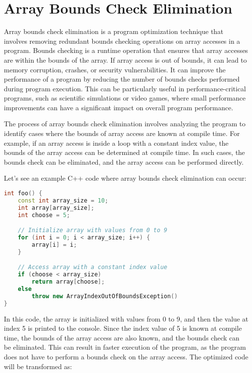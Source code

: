\section{Array Bounds Check Elimination}
\label{sec:array}

Array bounds check elimination is a program optimization technique that involves removing redundant bounds checking operations on array accesses in a program. Bounds checking is a runtime operation that ensures that array accesses are within the bounds of the array. If array access is out of bounds, it can lead to memory corruption, crashes, or security vulnerabilities. It can improve the performance of a program by reducing the number of bounds checks performed during program execution. This can be particularly useful in performance-critical programs, such as scientific simulations or video games, where small performance improvements can have a significant impact on overall program performance.

The process of array bounds check elimination involves analyzing the program to identify cases where the bounds of array access are known at compile time. For example, if an array access is inside a loop with a constant index value, the bounds of the array access can be determined at compile time. In such cases, the bounds check can be eliminated, and the array access can be performed directly.

Let's see an example C++ code where array bounds check elimination can occur:

\begin{lstlisting}[language=C++]
int foo() {
    const int array_size = 10;
    int array[array_size];
    int choose = 5;

    // Initialize array with values from 0 to 9
    for (int i = 0; i < array_size; i++) {
        array[i] = i;
    }

    // Access array with a constant index value
    if (choose < array_size)
        return array[choose];
    else 
        throw new ArrayIndexOutOfBoundsException()
}
\end{lstlisting}

In this code, the array is initialized with values from 0 to 9, and then the value at index 5 is printed to the console. Since the index value of 5 is known at compile time, the bounds of the array access are also known, and the bounds check can be eliminated. This can result in faster execution of the program, as the program does not have to perform a bounds check on the array access. The optimized code will be transformed as: 

